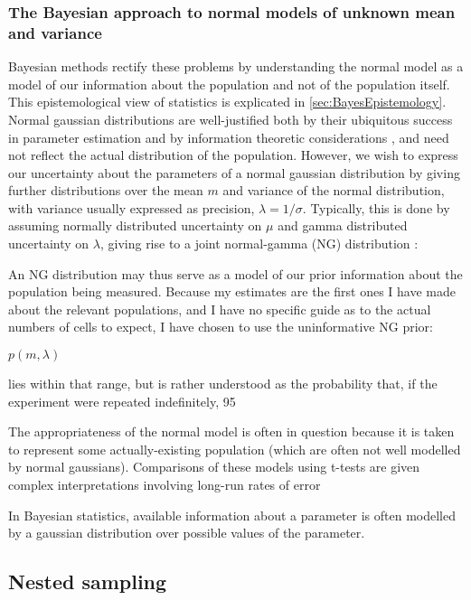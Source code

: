 \subsubsection{The Bayesian approach to normal models of unknown mean and variance}
Bayesian methods rectify these problems by understanding the normal model as a model of our information about the population and not of the population itself. This epistemological view of statistics is explicated in \autoref{sec:BayesEpistemology}. Normal gaussian distributions are well-justified both by their ubiquitous success in parameter estimation and by information theoretic considerations \cite{Jaynes2003}, and need not reflect the actual distribution of the population. However, we wish to express our uncertainty about the parameters of a normal gaussian distribution by giving further distributions over the mean $m$ and variance of the normal distribution, with variance usually expressed as precision, $\lambda = 1/\sigma$. Typically, this is done by  assuming normally distributed uncertainty on $\mu$ and gamma distributed uncertainty on $\lambda$, giving rise to a joint normal-gamma (NG) distribution \cite{Bernardo2000}:

An NG distribution may thus serve as a model of our prior information about the population being measured. Because my estimates are the first ones I have made about the relevant populations, and I have no specific guide as to the actual numbers of cells to expect, I have chosen to use the uninformative NG prior:

$p(m,\lambda)$

lies within that range, but is rather understood as the probability that, if the experiment were repeated indefinitely, 95

The appropriateness of the normal model is often in question because it is taken to represent some actually-existing population (which are often not well modelled by normal gaussians). Comparisons of these models using t-tests are given complex interpretations involving long-run rates of error

In Bayesian statistics, available information about a parameter is often modelled by a gaussian distribution over possible values of the parameter. 

\subsection{Nested sampling}
\label{ssec:nested}